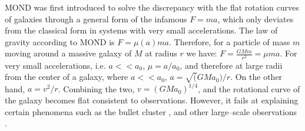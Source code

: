 \documentclass[paper=a4, fontsize=11pt]{scrartcl} %
\numberwithin{equation}{section} %
\numberwithin{figure}{section} %
\numberwithin{table}{section} %
\begin{document}
MOND was first introduced to solve the discrepancy with the flat rotation curves of galaxies through a general form of the infamous $F = ma$, which only deviates from the classical form in systems with very small accelerations. The law of gravity according to MOND is $F=\mu(a)ma$. Therefore, for a particle of mass $m$ moving around a massive galaxy of $M$ at radius $r$ we have: $F = \frac{GMm}{r^2} = \mu m a$. For very small accelerations, i.e. $a<<a_0$, $\mu = a/a_0$, and therefore at large radii from the center of a galaxy, where $a<<a_0$, $a=\sqrt(GMa_0)/r$. On the other hand, $a = v^2/r$. Combining the two, $v = (GMa_0)^\mathrm{1/4}$, and the rotational curve of the galaxy becomes flat consistent to observations. However, it fails at explaining certain phenomena such as the bullet cluster \citep[ref 17][]{}, and other large--scale observations \citep[ref 16 in lecture notes][]{}.

\end{document}
